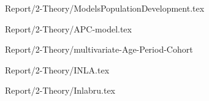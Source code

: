 {Report/2-Theory/ModelsPopulationDevelopment.tex}

{Report/2-Theory/APC-model.tex}

{Report/2-Theory/multivariate-Age-Period-Cohort}

{Report/2-Theory/INLA.tex}

{Report/2-Theory/Inlabru.tex}


